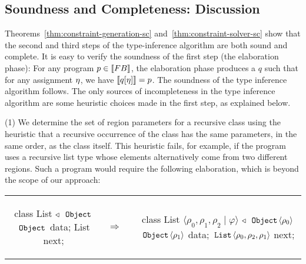 \subsection{Soundness and Completeness: Discussion}

Theorems~\ref{thm:constraint-generation-sc} and~\ref{thm:constraint-solver-sc}
show that the second and third steps of the type-inference algorithm are both
sound and complete.
It is easy to verify the soundness of the first step (the elaboration phase):
For any program $p \in \llbracket {\sc FB} \rrbracket$, the elaboration phase produces a $q$
such that for any assignment $\eta$, we have $\llbracket q[\eta] \rrbracket = p$.
%
The soundness of the type inference algorithm follows.
The only sources of incompleteness in the type inference algorithm are some heuristic
choices made in the first step, as explained below.





  (1) We determine the set of region parameters for a recursive class
using the heuristic that a recursive occurrence of the class has
the same parameters, in the same order, as the class itself.
This heuristic fails, for example, if the program uses a recursive list type whose
elements alternatively come from two different regions. Such a program would require
the following elaboration, which is beyond the scope of our approach:

\begin{tabular}{ccc}
\begin{minipage}{0.32\linewidth}
\begin{codejava}
class List $\triangleleft$ $\,{\tt Object}\,$
{
  $\,{\tt Object}\,$ data;
  List next;
}
\end{codejava}
\end{minipage}
&
$\Rightarrow  \; \; \;$
&
\begin{minipage}{0.65\linewidth}
\begin{codejava}
class List $\langle \rho_0, \rho_1, \rho_2 \; | \; \varphi \rangle$ $\triangleleft$ $\,{\tt Object}\, \langle \rho_0 \rangle$
{
  $\,{\tt Object}\, \langle \rho_1 \rangle$ data;
  $\,{\tt List}\, \langle \rho_0, \rho_2, \rho_1 \rangle$ next;
}
\end{codejava}
\end{minipage}
\end{tabular}

